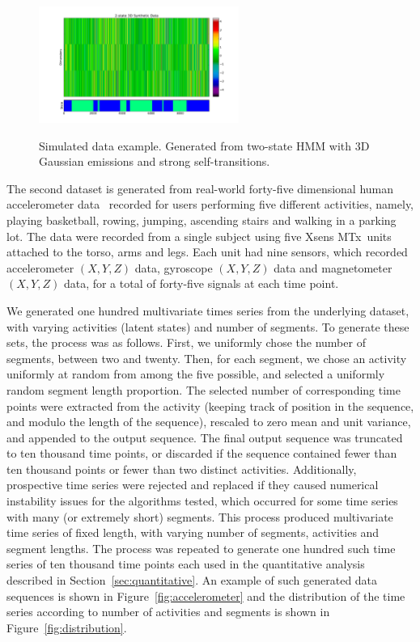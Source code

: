\documentclass[letterpaper]{article}
\begin{document}
\begin{figure}[htbp]
  \centering
    \includegraphics[width=1.\linewidth,
    height = 1.5in]{images/3D_synthetic_data_example.pdf}
    \label{fig:simulated}
  \caption{\small{Simulated data example. Generated from two-state HMM with 3D
  Gaussian emissions and strong self-transitions.}}
\end{figure}
The second dataset is generated from real-world forty-five dimensional human accelerometer data~\cite{Altun:2010:CSC:1823245.1823314} recorded for users performing five different activities, namely, playing basketball, rowing, jumping, ascending stairs and walking in a parking lot. The data were recorded from a single subject using five Xsens MTx\texttrademark\ units attached to the torso, arms and legs. Each unit had nine sensors, which recorded accelerometer $(X, Y, Z)$ data, gyroscope $(X,Y,Z)$ data and magnetometer $(X,Y,Z)$ data, for a total of forty-five signals at each time point.

We generated one hundred multivariate times series from the underlying dataset,
with varying activities (latent states) and number of segments. To generate
these sets, the process was as follows. First, we uniformly chose the number of
segments, between two and twenty. Then, for each segment, we chose an activity
uniformly at random from among the five possible, and selected a uniformly
random segment length proportion. The selected number of corresponding time
points were extracted from the activity (keeping track of position in the
sequence, and modulo the length of the sequence), rescaled to zero mean and unit
variance, and appended to the output sequence. The final output sequence was
truncated to ten thousand time points, or discarded if the sequence contained
fewer than ten thousand points or fewer than two distinct activities.
Additionally, prospective time series were rejected and replaced if they caused
numerical instability issues for the algorithms tested, which occurred for some
time series with many (or extremely short) segments. This process produced
multivariate time series of fixed length, with varying number of segments,
activities and segment lengths. The process was repeated to generate one hundred
such time series of ten thousand time points each used in the quantitative
analysis described in Section~\ref{sec:quantitative}. An example of such
generated data sequences is shown in Figure~\ref{fig:accelerometer} and the
distribution of the time series according to number of activities and segments
is shown in Figure~\ref{fig:distribution}.
\end{document}

